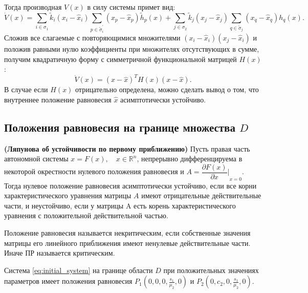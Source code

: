 \documentclass[14pt,a4paper]{extarticle}
\begin{document}
	Тогда производная $V(x)$ в силу системы примет вид:
	\[\dot{V}(x)=\sum\limits_{i\in\sigma_1}\tilde{k}_i(x_i-\hat{x}_i)\sum\limits_{p\in\tilde{\sigma}^\prime_i}(x_p-\hat{x}_p)\tilde{h}_{p}(x)+\sum\limits_{j\in\sigma_2}\tilde{k}_j(x_j-\hat{x}_j)\sum\limits_{q\in\tilde{\sigma}_j}(x_q-\hat{x}_q)h_{q}(x).\]
	Сложив все слагаемые с повторяющимися множителями $(x_i-\hat{x}_i)(x_j-\hat{x}_i)$ и положив равными нулю коэффициенты при множителях отсутствующих в сумме, получим квадратичную форму с симметричной функциональной матрицей $H(x)$:
	\[\dot{V}(x)=(x-\hat{x})^{T}H(x)(x-\hat{x}).\]
	В случае если $H(x)$ отрицательно определена, можно сделать вывод о том, что внутреннее положение равновесия $\hat{x}$ асимптотически устойчиво. 

	\subsection{Положения равновесия на границе множества $D$}
	
	\begin{theorem}\textbf{(Ляпунова об устойчивости по первому приближению)}
		Пусть правая часть автономной системы $x = F(x),\quad x\in\mathbb{R}^n$, непрерывно дифференцируема в некоторой окрестности нулевого положения равновесия и $A = {\dfrac{\partial F(x)}{\partial x}\biggr\rvert}_{x=0}$. Тогда нулевое положение равновесия асимптотически устойчиво, если все корни характеристического уравнения матрицы $A$ имеют отрицательные действительные части, и неустойчиво, если у матрицы A есть корень характеристического уравнения с положительной действительной частью.
	\end{theorem}
	
	\begin{definition}
		Положение равновесия называется некритическим, если собственные значения матрицы его линейного приближения имеют ненулевые действительные части. Иначе ПР называется критическим. 
	\end{definition}
	
	\begin{theorem}\label{th:border_eqpoints}
		Система \ref{eq:initial_system} на границе области $D$ при положительных значениях параметров имеет положения равновесия $P_1\left(0,0,0,\frac{s_1}{\mu_2},0\right)$ и $P_2\left(0,c_2,0,\frac{s_1}{\mu_2},0\right)$. 
	\end{theorem}
	
\end{document}
